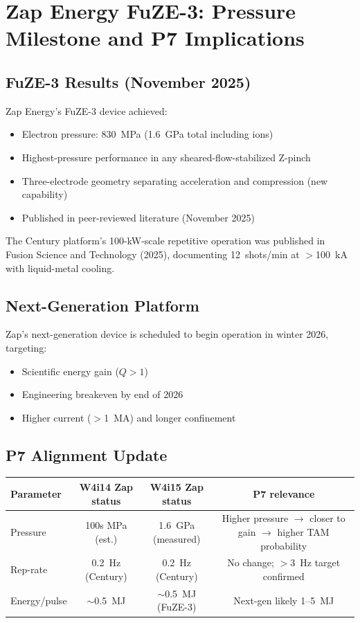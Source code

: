 \documentclass[11pt]{article}
\begin{document}
\section{Zap Energy FuZE-3: Pressure Milestone and P7 Implications}
\label{sec:zap-update}

\subsection{FuZE-3 Results (November 2025)}

Zap Energy's FuZE-3 device achieved:
\begin{itemize}[nosep]
  \item Electron pressure: 830~MPa (1.6~GPa total including ions)
  \item Highest-pressure performance in any sheared-flow-stabilized
    Z-pinch
  \item Three-electrode geometry separating acceleration and
    compression (new capability)
  \item Published in peer-reviewed literature (November 2025)
\end{itemize}

The Century platform's 100-kW-scale repetitive operation was
published in Fusion Science and Technology (2025), documenting
12~shots/min at $>$100~kA with liquid-metal cooling.

\subsection{Next-Generation Platform}

Zap's next-generation device is scheduled to begin operation in
winter 2026, targeting:
\begin{itemize}[nosep]
  \item Scientific energy gain ($Q > 1$)
  \item Engineering breakeven by end of 2026
  \item Higher current ($>$1~MA) and longer confinement
\end{itemize}

\subsection{P7 Alignment Update}

\begin{center}
\begin{tabular}{lccc}
\toprule
Parameter & W4i14 Zap status & W4i15 Zap status & P7 relevance \\
\midrule
Pressure & 100s MPa (est.) & 1.6~GPa (measured) & Higher pressure
  $\to$ closer to gain $\to$ higher TAM probability \\
Rep-rate & 0.2~Hz (Century) & 0.2~Hz (Century) & No change;
  $>$3~Hz target confirmed \\
Energy/pulse & $\sim$0.5~MJ & $\sim$0.5~MJ (FuZE-3) & Next-gen
  likely 1--5~MJ \\
\bottomrule
\end{tabular}
\end{center}
\end{document}
